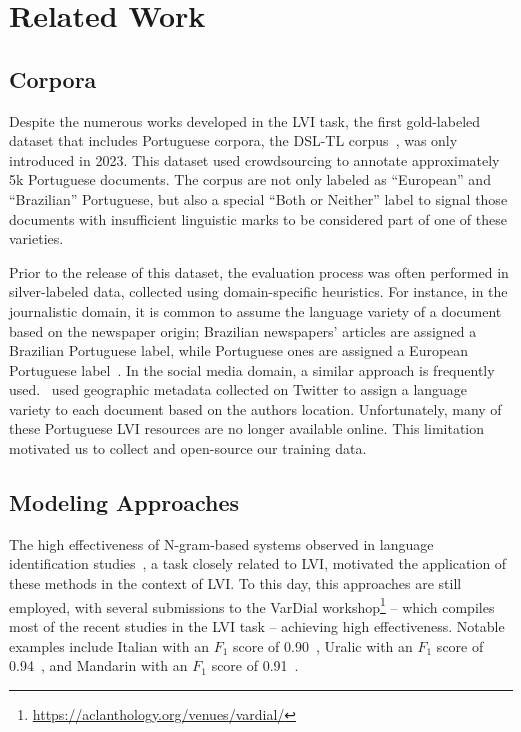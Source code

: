 \section{Related Work}
\label{sec:related_work}

\subsection{Corpora}

Despite the numerous works developed in the LVI task, the first gold-labeled dataset that includes Portuguese corpora, the DSL-TL corpus~\cite{zampieri2023language}, was only introduced in 2023. This dataset used crowdsourcing to annotate approximately 5k Portuguese documents. The corpus are not only labeled as ``European'' and ``Brazilian'' Portuguese, but also a special ``Both or Neither'' label to signal those documents with insufficient linguistic marks to be considered part of one of these varieties. 

Prior to the release of this dataset, the evaluation process was often performed in silver-labeled data, collected using domain-specific heuristics. For instance, in the journalistic domain, it is common to assume the language variety of a document based on the newspaper origin; Brazilian newspapers' articles are assigned a Brazilian Portuguese label, while Portuguese ones are assigned a European Portuguese label~\cite{da2006identification, zampieri2012automatic, tan2014merging}. In the social media domain, a similar approach is frequently used.~\citet{castro2016discriminating} used geographic metadata collected on Twitter to assign a language variety to each document based on the authors location. Unfortunately, many of these Portuguese LVI resources are no longer available online. This limitation motivated us to collect and open-source our training data.


\subsection{Modeling Approaches}
\label{subsec:techniques_used}

The high effectiveness of N-gram-based systems observed in language identification studies~\cite{mcnamee2005language, martins2005language, chew2009optimizing}, a task closely related to LVI, motivated the application of these methods in the context of LVI. To this day, this approaches are still employed, with several submissions to the VarDial workshop\footnote{\url{https://aclanthology.org/venues/vardial/}} -- which compiles most of the recent studies in the LVI task -- achieving high effectiveness. Notable examples include Italian with an $F_1$ score of 0.90~\cite{jauhiainen-etal-2022-italian}, Uralic with an $F_1$ score of 0.94~\cite{bernier-colborne-etal-2021-n}, and Mandarin with an $F_1$ score of 0.91~\cite{yang-xiang-2019-naive}.

